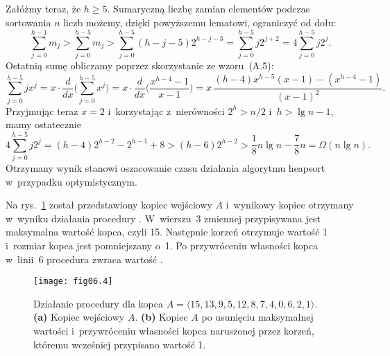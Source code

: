 Załóżmy teraz, że $h\ge5$. Sumaryczną liczbę zamian elementów podczas sortowania $n$ liczb możemy, dzięki powyższemu lematowi, ograniczyć od dołu:
\[
    \sum_{j=0}^{h-1}m_j > \sum_{j=0}^{h-5}m_j > \sum_{j=0}^{h-5}(h-j-5)2^{h-j-3} = \sum_{j=0}^{h-5}j2^{j+2} = 4\sum_{j=0}^{h-5}j2^j.
\]
Ostatnią sumę obliczamy poprzez skorzystanie ze wzoru~(A.5):
\[
    \sum_{j=0}^{h-5}jx^j = x\cdot\frac{d}{dx}\biggl(\sum_{j=0}^{h-5}x^j\biggr) = x\cdot\frac{d}{dx}\biggl(\frac{x^{h-4}-1}{x-1}\biggr) = x\,\frac{(h-4)x^{h-5}(x-1)-(x^{h-4}-1)}{(x-1)^2}.
\]
Przyjmując teraz $x=2$ i~korzystając z~nierówności $2^h>n/2$ i~$h>\lg n-1$, mamy ostatecznie
\[
    4\sum_{j=0}^{h-5}j2^j = (h-4)2^{h-2}-2^{h-1}+8 > (h-6)2^{h-2} > \frac{1}{8}n\lg n-\frac{7}{8}n = \Omega(n\lg n).
\]
Otrzymany wynik stanowi oszacowanie czasu działania algorytmu heapsort w~przypadku optymistycznym.


\exercise %
Na rys.~\ref{fig:6.5-1} został przedstawiony kopiec wejściowy $A$ i~wynikowy kopiec otrzymany w~wyniku działania procedury . W~wierszu~3 zmiennej  przypisywana jest maksymalna wartość kopca, czyli 15. Następnie korzeń otrzymuje wartość 1 i~rozmiar kopca jest pomniejszany o~1. Po przywróceniu własności kopca w~linii~6 procedura zwraca wartość .
\begin{figure}[ht]
	\begin{center}
		\texttt{[image: fig06.4]}
	\end{center}
	\caption{Działanie procedury  dla kopca $A=\langle15,13,9,5,12,8,7,4,0,6,2,1\rangle$. {\sffamily\bfseries(a)} Kopiec wejściowy $A$. {\sffamily\bfseries(b)} Kopiec $A$ po usunięciu maksymalnej wartości i~przywróceniu własności kopca naruszonej przez korzeń, któremu wcześniej przypisano wartość 1.} \label{fig:6.5-1}
\end{figure}

